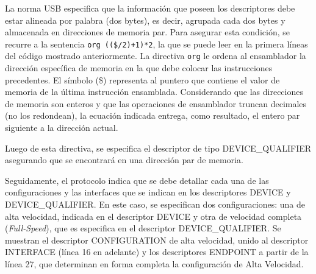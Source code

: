 	La norma USB especifica que la información que poseen los descriptores debe estar alineada por palabra (dos bytes), es decir, agrupada cada dos bytes y almacenada en direcciones de memoria par. Para asegurar esta condición, se recurre a la sentencia \verb|org (($/2)+1)*2|, la que se puede leer en la primera líneas del código mostrado anteriormente. La directiva \verb|org| le ordena al ensamblador la dirección específica de memoria en la que debe colocar las instrucciones precedentes. El símbolo (\$) representa al puntero que contiene el valor de memoria de la última instrucción ensamblada. Considerando que las direcciones de memoria son enteros y que las operaciones de ensamblador truncan decimales (no los redondean), la ecuación indicada entrega, como resultado, el entero par siguiente a la dirección actual. 

	Luego de esta directiva, se especifica el descriptor de tipo DEVICE\_QUALIFIER asegurando que se encontrará en una dirección par de memoria.
	
	Seguidamente, el protocolo indica que se debe detallar cada una de las configuraciones y las interfaces que se indican en los descriptores DEVICE y DEVICE\_QUALIFIER. En este caso, se especifican dos configuraciones: una de alta velocidad, indicada en el descriptor DEVICE y otra de velocidad completa ({\it Full-Speed}), que es especifica en el descriptor DEVICE\_QUALIFIER. Se muestran el descriptor CONFIGURATION de alta velocidad, unido al descriptor INTERFACE (línea 16 en adelante) y los descriptores ENDPOINT a partir de la línea 27, que determinan en forma completa la configuración de Alta Velocidad.
	
